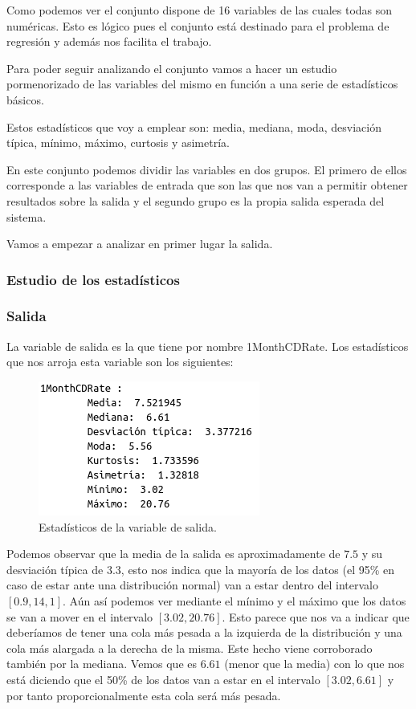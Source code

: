 \documentclass[12pt,a4paper]{article}
\begin{document}
Como podemos ver el conjunto dispone de 16 variables de las cuales todas son numéricas. Esto es lógico pues el conjunto está destinado para el problema de regresión y además nos facilita el trabajo. 

Para poder seguir analizando el conjunto vamos a hacer un estudio pormenorizado de las variables del mismo en función a una serie de estadísticos básicos.

Estos estadísticos que voy a emplear son: media, mediana, moda, desviación típica, mínimo, máximo, curtosis y asimetría.

En este conjunto podemos dividir las variables en dos grupos. El primero de ellos corresponde a las variables de entrada que son las que nos van a permitir obtener resultados sobre la salida y el segundo grupo es la propia salida esperada del sistema.

Vamos a empezar a analizar en primer lugar la salida.

\subsubsection{Estudio de los estadísticos}

\subsubsection*{Salida}
La variable de salida es la que tiene por nombre 1MonthCDRate. Los estadísticos que nos arroja esta variable son los siguientes:

\begin{figure}[H]
	\centering
	\includegraphics[scale=0.7]{./Imagenes/estadisticos_1MonthCDRate.png}
	\caption{Estadísticos de la variable de salida.}
\end{figure}

Podemos observar que la  media de la salida es aproximadamente de $7.5$ y su desviación típica de $3.3$, esto nos indica que la mayoría de los datos (el 95\% en caso de estar ante una distribución normal) van a estar dentro del intervalo $[0.9,14,1]$. Aún así podemos ver mediante el mínimo y el máximo que los datos se van a mover en el intervalo $[3.02, 20.76]$. Esto parece que nos va a indicar que deberíamos de tener una cola más pesada a la izquierda de la distribución y una cola más alargada a la derecha de la misma. Este hecho viene corroborado también por la mediana. Vemos que es $6.61$ (menor que la media) con lo que nos está diciendo que el 50\% de los datos van a estar en el intervalo $[3.02, 6.61]$ y por tanto proporcionalmente esta cola será más pesada.
\end{document}
